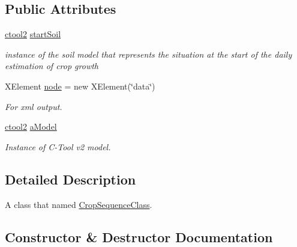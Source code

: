 \subsection*{Public Attributes}
\begin{DoxyCompactItemize}
\item 
\mbox{\label{class_crop_sequence_class_ab6529f542f15e934ba631c83e17224f1}} 
\mbox{\hyperlink{classctool2}{ctool2}} \mbox{\hyperlink{class_crop_sequence_class_ab6529f542f15e934ba631c83e17224f1}{start\+Soil}}
\begin{DoxyCompactList}\small\item\em instance of the soil model that represents the situation at the start of the daily estimation of crop growth \end{DoxyCompactList}\item 
\mbox{\label{class_crop_sequence_class_aeb621b262d3b943df74d6d2fc5835868}} 
X\+Element \mbox{\hyperlink{class_crop_sequence_class_aeb621b262d3b943df74d6d2fc5835868}{node}} = new X\+Element(\char`\"{}data\char`\"{})
\begin{DoxyCompactList}\small\item\em For xml output. \end{DoxyCompactList}\item 
\mbox{\label{class_crop_sequence_class_a46255236553411f929a97ecc1d68fb53}} 
\mbox{\hyperlink{classctool2}{ctool2}} \mbox{\hyperlink{class_crop_sequence_class_a46255236553411f929a97ecc1d68fb53}{a\+Model}}
\begin{DoxyCompactList}\small\item\em Instance of C-\/\+Tool v2 model. \end{DoxyCompactList}\end{DoxyCompactItemize}


\subsection{Detailed Description}
A class that named \mbox{\hyperlink{class_crop_sequence_class}{Crop\+Sequence\+Class}}. 

\subsection{Constructor \& Destructor Documentation}
\mbox{\label{class_crop_sequence_class_a0013767aa3275e61eed72c93a8fe8c88}} 
